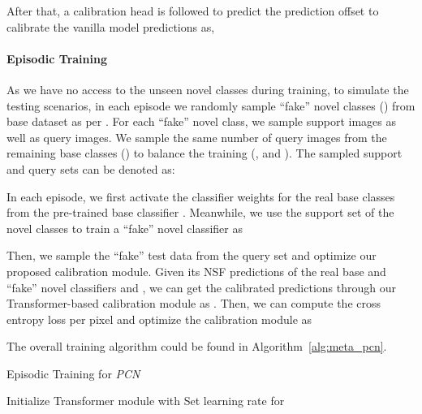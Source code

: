 \documentclass[journal]{IEEEtran}
\begin{document}
After that, a calibration head  is followed to predict the prediction offset to calibrate the vanilla model predictions as,


\paragraph{Episodic Training} 
\label{ep_t}
As we have no access to the unseen novel classes during training, to simulate the testing scenarios, in each episode we randomly sample  ``fake'' novel classes () from base dataset  as per \cite{gidaris2018dynamic,ye2021learning}. For each ``fake'' novel class, we sample  support images as well as  query images. We sample the same number of query images from the remaining  base classes () to balance the training (, and  ). The sampled support and query sets can be denoted as:


In each episode, we first activate the classifier weights  for the real base classes from the pre-trained base classifier . Meanwhile, we use the support set of the novel classes to train a ``fake'' novel classifier as 


Then, we sample the ``fake'' test data from the query set  and optimize our proposed calibration module. 
Given its NSF predictions  of the real base and ``fake'' novel classifiers  and , we can get the calibrated predictions  through our Transformer-based calibration module as . Then, we can compute the cross entropy loss per pixel and optimize the calibration module as 


The overall training algorithm could be found in Algorithm~\ref{alg:meta_pcn}.


\begin{algorithm}[t]
\caption{Episodic Training for \textit{PCN}}\label{alg:meta_pcn}
Initialize Transformer module  with \;
Set learning rate  for \;
\end{algorithm}
\end{document}

